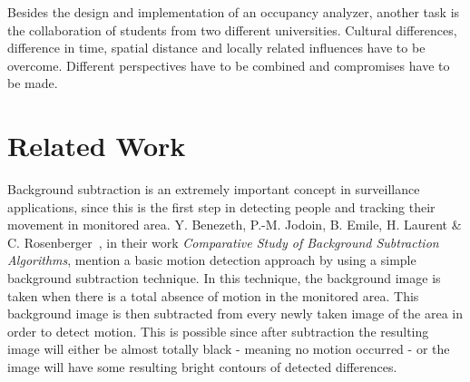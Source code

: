 Besides the design and implementation of an occupancy analyzer, another task is the collaboration of students from two different universities. Cultural differences, difference in time, spatial distance and locally related influences have to be overcome. Different perspectives have to be combined and compromises have to be made.

\section{Related Work}
\label{sub:related}





Background subtraction is an extremely important concept in surveillance applications, since this is the first step in detecting people and tracking their movement in monitored area. Y. Benezeth, P.-M. Jodoin, B. Emile, H. Laurent \& C. Rosenberger~\cite{simple_background_subtraction}, in their work \emph{Comparative Study of Background Subtraction Algorithms}, mention a basic motion detection approach by using a simple background subtraction technique. In this technique, the background image is taken when there is a total absence of motion in the monitored area. This background image is then subtracted from every newly taken image of the area in order to detect motion. This is possible since after subtraction the resulting image will either be almost totally black - meaning no motion occurred - or the image will have some resulting bright contours of detected differences.

